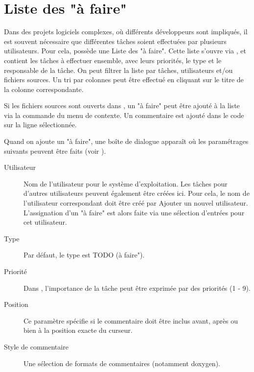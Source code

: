 \section{Liste des "à faire"}\label{sec:todo_list}

Dans des projets logiciels complexes, où différents développeurs sont impliqués, il est souvent nécessaire que différentes tâches soient effectuées par plusieurs utilisateurs. Pour cela, \codeblocks possède une Liste des "à faire". Cette liste s'ouvre via , et contient les tâches à effectuer ensemble, avec leurs priorités, le type et le responsable de la tâche. On peut filtrer la liste par tâches, utilisateurs et/ou fichiers sources. Un tri par colonnes peut être effectué en cliquant sur le titre de la colonne correspondante.



Si les fichiers sources sont ouverts dans \codeblocks, un "à faire" peut être ajouté à la liste via la commande  du menu de contexte. Un commentaire est ajouté dans le code sur la ligne sélectionnée.


Quand on ajoute un "à faire", une boîte de dialogue apparaît où les paramétrages suivants peuvent être faits (voir ).


\begin{description}
\item[Utilisateur] Nom de l'utilisateur  pour le système d'exploitation. Les tâches pour d'autres utilisateurs peuvent également être créées ici. Pour cela, le nom de l'utilisateur correspondant doit être créé par Ajouter un nouvel utilisateur. L'assignation d'un "à faire" est alors faite via une sélection d'entrées pour cet utilisateur.

\item[Type] Par défaut, le type est TODO (à faire").
\item[Priorité] Dans \codeblocks, l'importance de la tâche peut être exprimée par des priorités (1 - 9).
\item[Position] Ce paramètre spécifie si le commentaire doit être inclus avant, après ou bien à la position exacte du curseur.
\item[Style de commentaire] Une sélection de formats de commentaires (notamment doxygen).
\end{description}

